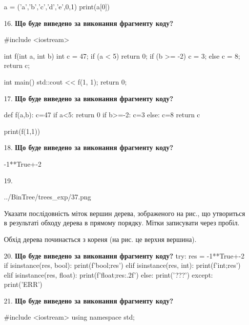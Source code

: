 \documentclass[11pt]{article}
\begin{document}
a = ('a','b','c','d','e',0,1)
print(a[0])

\par\vspace{5mm}
16. \textbf{Що буде виведено за виконання фрагменту коду?}

#include <iostream>

int f(int a, int b){
    int c = 47;
    if (a < 5)
        return 0;
    if (b >= -2)
         c = 3;
    else 
        c = 8;
    return c;
}

int main(){
    std::cout << f(1, 1);
    return 0;
}
\par\vspace{5mm}
17. \textbf{Що буде виведено за виконання фрагменту коду?}

def f(a,b):
    c=47
    if a<5:
        return 0
    if b>=-2:
         c=3
    else: 
        c=8
    return c

print(f(1,1))\par\vspace{5mm}
18. \textbf{Що буде виведено за виконання фрагменту коду?}

-1**True+-2
\par\vspace{5mm}
19. 

\begin{center}
	{../BinTree/trees_exp/37.png}
\end{center}
Указати послідовність міток вершин дерева, зображеного на рис., що утвориться в результаті обходу дерева в прямому порядку. Мітки записувати через пробіл.\par Обхід дерева починається з кореня (на рис. це верхня вершина).
\par\vspace{5mm}
20. \textbf{Що буде виведено за виконання фрагменту коду?}
try:
    res = -1**True+-2
    if isinstance(res, bool):
        print(f'bool;{res}')
    elif isinstance(res, int):
        print(f'int;{res}')
    elif isinstance(res, float):
        print(f'float;{res:.2f}')
    else:
        print('???')
except:
    print('ERR')
\par\vspace{5mm}
21. \textbf{Що буде виведено за виконання фрагменту коду?}

#include <iostream>
using namespace std;
\end{document}

